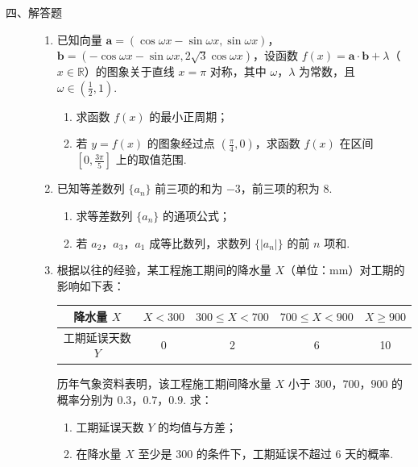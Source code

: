 \begin{description}

    \item[四、解答题]

    \begin{enumerate}[leftmargin=5pt]

      \addtocounter{enumi}{+16}

        \item 已知向量 \( \bm{a} = (\cos \omega x - \sin \omega x, \sin \omega x) \)，\( \bm{b} = (-\cos \omega x - \sin \omega x, 2\sqrt{3} \cos \omega x) \)，设函数 \( f(x) = \bm{a} \cdot \bm{b} + \lambda \)（\(x \in \mathbb{R}\)）的图象关于直线 \(x = \pi\) 对称，其中 \(\omega\)，\(\lambda\) 为常数，且 \(\omega \in \left(\frac{1}{2}, 1\right)\).

\begin{enumerate}
\item 求函数 \( f(x) \) 的最小正周期；
\item 若 \( y = f(x) \) 的图象经过点 \( \left(\frac{\pi}{4}, 0\right)\)，求函数 \( f(x) \) 在区间 \( \left[0, \frac{3\pi}{5}\right] \) 上的取值范围.
\end{enumerate}

        \item 已知等差数列 \(\{a_{n}\}\) 前三项的和为 \(-3\)，前三项的积为 \(8\).

\begin{enumerate}
\item 求等差数列 \(\{a_{n}\}\) 的通项公式；
\item 若 \(a_{2}\)，\(a_{3}\)，\(a_{1}\) 成等比数列，求数列 \(\{|a_{n}|\}\) 的前 \(n\) 项和.
\end{enumerate}

        \item 根据以往的经验，某工程施工期间的降水量 \(X\)（单位：\(\mathrm{mm}\)）对工期的影响如下表：

\begin{center}
\begin{tabular}{c|cccc}
降水量 \(X\) & \(X < 300\) & \(300 \leqslant X < 700\) & \(700 \leqslant X < 900\) & \(X \geqslant 900\) \\
\hline
工期延误天数 \(Y\) & 0 & 2 & 6 & 10
\end{tabular}
\end{center}

历年气象资料表明，该工程施工期间降水量 \(X\) 小于 \(300\)，\(700\)，\(900\) 的概率分别为 \(0.3\)，\(0.7\)，\(0.9\). 求：

\begin{enumerate}
\item 工期延误天数 \(Y\) 的均值与方差；
\item 在降水量 \(X\) 至少是 \(300\) 的条件下，工期延误不超过 \(6\) 天的概率.
\end{enumerate}


\end{enumerate}
\end{description}
